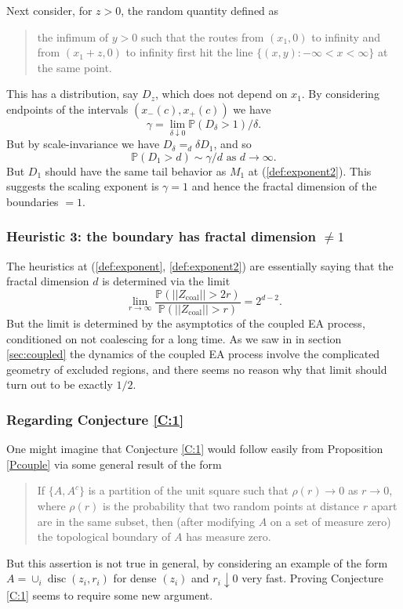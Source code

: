 \documentclass[12pt]{article}
\renewcommand{\Pr}{{\mathbb P}}
\newcommand{\Zcouple}{Z_{\mathrm{coal}}}
\DeclareMathOperator{\disc}{disc}
\begin{document}
 Next consider, for $z > 0$, the random quantity defined as
 \begin{quote}
 the infimum of $y>0$ such that  the routes from $(x_1,0)$ to infinity and from $(x_1+z,0)$ to infinity 
 first hit the line $\{(x,y): - \infty < x < \infty \}$
 at the same point.
 \end{quote}
 This has a distribution, say $D_z$, which does not depend on $x_1$.
 By considering endpoints of the intervals $(x_-(c), x_+(c))$ we have 
 \[ \gamma = \lim_{\delta \downarrow 0} \Pr(D_\delta > 1)/\delta . \]
 But by scale-invariance we have $D_\delta =_d \delta D_1$, and so 
 \[ \Pr(D_1 > d) \sim \gamma/d \mbox{ as } d \to \infty . \] 
 But $D_1$ should have the same tail behavior as $M_1$ at (\ref{def:exponent2}). 
 This suggests the scaling exponent is $\gamma = 1$ and hence the fractal dimension of the boundaries $= 1$.

 
\subsubsection{Heuristic 3: the boundary has fractal dimension $\neq 1$}

The heuristics at (\ref{def:exponent},  \ref{def:exponent2}) are essentially saying that the fractal dimension $d$ is determined via the limit
\[ \lim_{r \to \infty} \frac{  \Pr( || \Zcouple || > 2r)  }{  \Pr( || \Zcouple || > r)  } = 2^{d - 2}  . \]
But the limit is determined by the asymptotics of the coupled EA process, conditioned on  not coalescing for a long time.
As we saw in in section \ref{sec:coupled} the dynamics of the coupled EA process involve the complicated geometry of excluded regions, and there seems
 no reason why that limit should turn out to be exactly $1/2$.
 
 
 \subsubsection{Regarding Conjecture \ref{C:1} }
One might imagine that Conjecture \ref{C:1} would follow easily from Proposition \ref{Pcouple} via some general result of the form
\begin{quote}
If $\{A, A^c\}$ is  a partition of the unit square such that $\rho(r) \to 0 $ as $r \to 0$,
where $\rho(r)$ is the probability that two random points at distance $r$ apart are in the same subset,
then (after modifying $A$ on a set of measure zero) the topological boundary of $A$ has measure zero.
 \end{quote}
 But this assertion is not true in general, by considering an example of the form 
 $A = \cup_i \disc(z_i,r_i)$ for dense $(z_i)$ and $r_i \downarrow 0$ very fast.
 Proving Conjecture \ref{C:1} seems to require some new argument.
\end{document}
